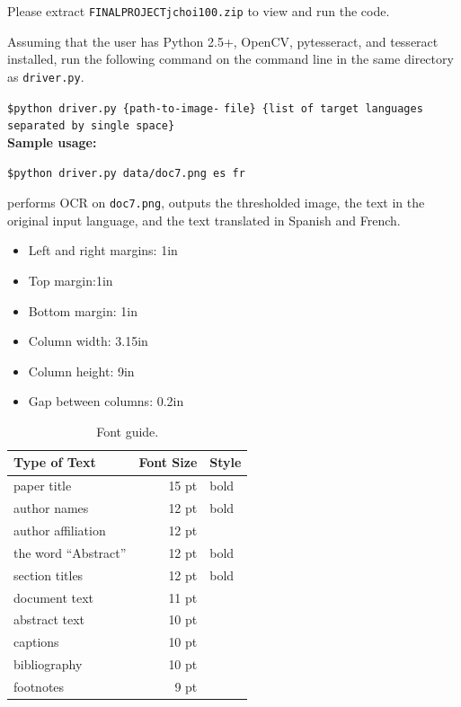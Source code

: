 \documentclass[11pt,letterpaper]{article}
\begin{document}
Please extract {\tt FINAL\textunderscore PROJECT\textunderscore jchoi100.zip} to view and run the code.

Assuming that the user has Python 2.5+, OpenCV, pytesseract, and tesseract installed, run the following command on the command line in the same directory as {\tt driver.py}.

{\tt \$python driver.py \{path-to-image-} {\tt file\} \{list of target languages separated by single space\}}\\

\textbf{Sample usage:}

{\tt \$python driver.py data/doc7.png es fr}

performs OCR on {\tt doc7.png}, outputs the thresholded image, the text in the original input language, and the text translated in Spanish and French.


\begin{itemize}
\item Left and right margins: 1in
\item Top margin:1in
\item Bottom margin: 1in
\item Column width: 3.15in
\item Column height: 9in
\item Gap between columns: 0.2in
\end{itemize}


\begin{table}
\begin{center}
\begin{tabular}{|l|rl|}
\hline \bf Type of Text & \bf Font Size & \bf Style \\ \hline
paper title & 15 pt & bold \\
author names & 12 pt & bold \\
author affiliation & 12 pt & \\
the word ``Abstract'' & 12 pt & bold \\
section titles & 12 pt & bold \\
document text & 11 pt  &\\
abstract text & 10 pt & \\
captions & 10 pt & \\
bibliography & 10 pt & \\
footnotes & 9 pt & \\
\hline
\end{tabular}
\end{center}
\caption{\label{font-table} Font guide. }
\end{table}
\end{document}
